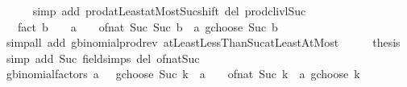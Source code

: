 \begin{isabellebody}
\ \ \ \ \isamarkupfalse%
\ {\isacharparenleft}{\kern0pt}simp\ add{\isacharcolon}{\kern0pt}\ prod{\isachardot}{\kern0pt}atLeast{}{\isacharunderscore}{\kern0pt}atMost{\isacharunderscore}{\kern0pt}Suc{\isacharunderscore}{\kern0pt}shift\ del{\isacharcolon}{\kern0pt}\ prod{\isachardot}{\kern0pt}cl{\isacharunderscore}{\kern0pt}ivl{\isacharunderscore}{\kern0pt}Suc{\isacharparenright}{\kern0pt}\isanewline
\ \ \isamarkupfalse%
\ \isamarkupfalse%
\ {\isachardoublequoteopen}{\isasymdots}\ {\isacharslash}{\kern0pt}\ fact\ {\isacharparenleft}{\kern0pt}b\ {\isacharplus}{\kern0pt}\ {}{\isacharparenright}{\kern0pt}\ {\isacharequal}{\kern0pt}\ {\isacharparenleft}{\kern0pt}a\ {\isacharplus}{\kern0pt}\ {}{\isacharparenright}{\kern0pt}\ {\isacharslash}{\kern0pt}\ of{\isacharunderscore}{\kern0pt}nat\ {\isacharparenleft}{\kern0pt}Suc\ {\isacharparenleft}{\kern0pt}Suc\ b{\isacharparenright}{\kern0pt}{\isacharparenright}{\kern0pt}\ {\isacharasterisk}{\kern0pt}\ {\isacharparenleft}{\kern0pt}a\ gchoose\ Suc\ b{\isacharparenright}{\kern0pt}{\isachardoublequoteclose}\isanewline
\ \ \ \ \isamarkupfalse%
\ {\isacharparenleft}{\kern0pt}simp{\isacharunderscore}{\kern0pt}all\ add{\isacharcolon}{\kern0pt}\ gbinomial{\isacharunderscore}{\kern0pt}prod{\isacharunderscore}{\kern0pt}rev\ atLeastLessThanSuc{\isacharunderscore}{\kern0pt}atLeastAtMost{\isacharparenright}{\kern0pt}\isanewline
\ \ \isamarkupfalse%
\ \isamarkupfalse%
\ {\isacharquery}{\kern0pt}thesis\ \isamarkupfalse%
\ {\isacharparenleft}{\kern0pt}simp\ add{\isacharcolon}{\kern0pt}\ Suc\ field{\isacharunderscore}{\kern0pt}simps\ del{\isacharcolon}{\kern0pt}\ of{\isacharunderscore}{\kern0pt}nat{\isacharunderscore}{\kern0pt}Suc{\isacharparenright}{\kern0pt}\isanewline
{}\isamarkupfalse%
%
\endisatagproof
{\isafoldproof}%
%
\isadelimproof
\isanewline
%
\endisadelimproof
\isanewline
{}\isamarkupfalse%
\ gbinomial{\isacharunderscore}{\kern0pt}factors{\isacharcolon}{\kern0pt}\ {\isachardoublequoteopen}{\isacharparenleft}{\kern0pt}{\isacharparenleft}{\kern0pt}a\ {\isacharplus}{\kern0pt}\ {}{\isacharparenright}{\kern0pt}\ gchoose\ {\isacharparenleft}{\kern0pt}Suc\ k{\isacharparenright}{\kern0pt}{\isacharparenright}{\kern0pt}\ {\isacharequal}{\kern0pt}\ {\isacharparenleft}{\kern0pt}a\ {\isacharplus}{\kern0pt}\ {}{\isacharparenright}{\kern0pt}\ {\isacharslash}{\kern0pt}\ of{\isacharunderscore}{\kern0pt}nat\ {\isacharparenleft}{\kern0pt}Suc\ k{\isacharparenright}{\kern0pt}\ {\isacharasterisk}{\kern0pt}\ {\isacharparenleft}{\kern0pt}a\ gchoose\ k{\isacharparenright}{\kern0pt}{\isachardoublequoteclose}\isanewline

\end{isabellebody}
